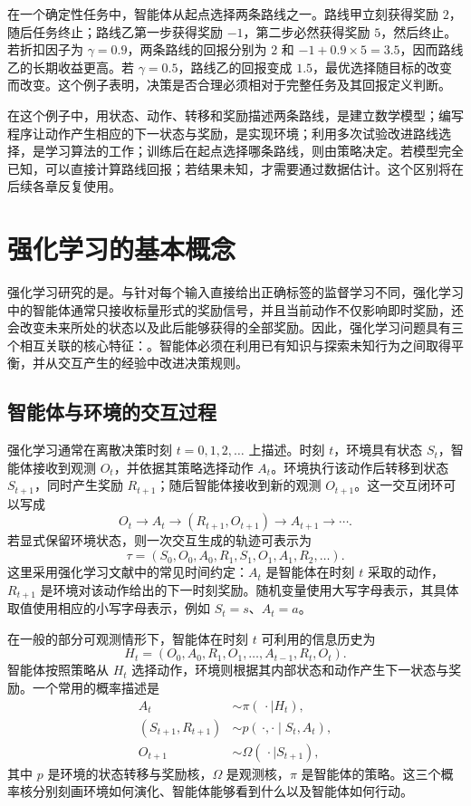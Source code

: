 \documentclass[UTF8,12pt,a4paper,fontset=fandol]{ctexbook}
\begin{document}
\begin{example}[先付出代价是否值得]
在一个确定性任务中，智能体从起点选择两条路线之一。路线甲立刻获得奖励 $2$，随后任务终止；路线乙第一步获得奖励 $-1$，第二步必然获得奖励 $5$，然后终止。若折扣因子为 $\gamma=0.9$，两条路线的回报分别为 $2$ 和 $-1+0.9\times5=3.5$，因而路线乙的长期收益更高。若 $\gamma=0.5$，路线乙的回报变成 $1.5$，最优选择随目标的改变而改变。这个例子表明，决策是否合理必须相对于完整任务及其回报定义判断。
\end{example}

在这个例子中，用状态、动作、转移和奖励描述两条路线，是建立数学模型；编写程序让动作产生相应的下一状态与奖励，是实现环境；利用多次试验改进路线选择，是学习算法的工作；训练后在起点选择哪条路线，则由策略决定。若模型完全已知，可以直接计算路线回报；若结果未知，才需要通过数据估计。这个区别将在后续各章反复使用。


\section{强化学习的基本概念}


强化学习研究的是。与针对每个输入直接给出正确标签的监督学习不同，强化学习中的智能体通常只接收标量形式的奖励信号，并且当前动作不仅影响即时奖励，还会改变未来所处的状态以及此后能够获得的全部奖励。因此，强化学习问题具有三个相互关联的核心特征：。智能体必须在利用已有知识与探索未知行为之间取得平衡，并从交互产生的经验中改进决策规则。


\subsection{智能体与环境的交互过程}


强化学习通常在离散决策时刻 $t=0,1,2,\ldots$ 上描述。时刻 $t$，环境具有状态 $S_t$，智能体接收到观测 $O_t$，并依据其策略选择动作 $A_t$。环境执行该动作后转移到状态 $S_{t+1}$，同时产生奖励 $R_{t+1}$；随后智能体接收到新的观测 $O_{t+1}$。这一交互闭环可以写成
\[
  O_t \longrightarrow A_t \longrightarrow (R_{t+1},O_{t+1})
  \longrightarrow A_{t+1} \longrightarrow \cdots .
\]
若显式保留环境状态，则一次交互生成的轨迹可表示为
\[
  \tau=(S_0,O_0,A_0,R_1,S_1,O_1,A_1,R_2,\ldots).
\]
这里采用强化学习文献中的常见时间约定：$A_t$ 是智能体在时刻 $t$ 采取的动作，$R_{t+1}$ 是环境对该动作给出的下一时刻奖励。随机变量使用大写字母表示，其具体取值使用相应的小写字母表示，例如 $S_t=s$、$A_t=a$。


在一般的部分可观测情形下，智能体在时刻 $t$ 可利用的信息历史为
\[
  H_t=(O_0,A_0,R_1,O_1,\ldots,A_{t-1},R_t,O_t).
\]
智能体按照策略从 $H_t$ 选择动作，环境则根据其内部状态和动作产生下一状态与奖励。一个常用的概率描述是
\begin{align*}
  A_t &\sim \pi(\,\cdot\mid H_t),\\
  (S_{t+1},R_{t+1}) &\sim p(\,\cdot,\cdot\mid S_t,A_t),\\
  O_{t+1} &\sim \Omega(\,\cdot\mid S_{t+1}),
\end{align*}
其中 $p$ 是环境的状态转移与奖励核，$\Omega$ 是观测核，$\pi$ 是智能体的策略。这三个概率核分别刻画环境如何演化、智能体能够看到什么以及智能体如何行动。
\end{document}
